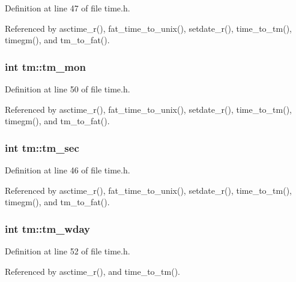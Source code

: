 Definition at line 47 of file time.\-h.



Referenced by asctime\-\_\-r(), fat\-\_\-time\-\_\-to\-\_\-unix(), setdate\-\_\-r(), time\-\_\-to\-\_\-tm(), timegm(), and tm\-\_\-to\-\_\-fat().

\hypertarget{structtm_a112ac36fa2f593777138a417cf031e17}{
\subsubsection[{tm\-\_\-mon}]{\setlength{\rightskip}{0pt plus 5cm}int tm\-::tm\-\_\-mon}}\label{structtm_a112ac36fa2f593777138a417cf031e17}


Definition at line 50 of file time.\-h.



Referenced by asctime\-\_\-r(), fat\-\_\-time\-\_\-to\-\_\-unix(), setdate\-\_\-r(), time\-\_\-to\-\_\-tm(), timegm(), and tm\-\_\-to\-\_\-fat().

\hypertarget{structtm_a4d098a9a5c03a00b2ee61e10851de81e}{
\subsubsection[{tm\-\_\-sec}]{\setlength{\rightskip}{0pt plus 5cm}int tm\-::tm\-\_\-sec}}\label{structtm_a4d098a9a5c03a00b2ee61e10851de81e}


Definition at line 46 of file time.\-h.



Referenced by asctime\-\_\-r(), fat\-\_\-time\-\_\-to\-\_\-unix(), setdate\-\_\-r(), time\-\_\-to\-\_\-tm(), timegm(), and tm\-\_\-to\-\_\-fat().

\hypertarget{structtm_afe81a8c46f1c693c43f259b288859f4f}{
\subsubsection[{tm\-\_\-wday}]{\setlength{\rightskip}{0pt plus 5cm}int tm\-::tm\-\_\-wday}}\label{structtm_afe81a8c46f1c693c43f259b288859f4f}


Definition at line 52 of file time.\-h.



Referenced by asctime\-\_\-r(), and time\-\_\-to\-\_\-tm().

